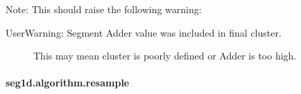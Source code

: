 \documentclass[letterpaper,10pt,english]{sphinxmanual}
\begin{document}
\begin{fulllineitems}
\sphinxAtStartPar
Note: This should raise the following warning:
\begin{description}
\item[{UserWarning: Segment Adder value was included in final cluster.}] \leavevmode
\sphinxAtStartPar
This may mean cluster is poorly defined or Adder is too high.

\end{description}

\begin{sphinxVerbatim}[commandchars=\\\{\}]
\end{sphinxVerbatim}

\end{fulllineitems}



\paragraph{seg1d.algorithm.resample}
\label{\detokenize{generated/seg1d.algorithm.resample:seg1d-algorithm-resample}}\label{\detokenize{generated/seg1d.algorithm.resample::doc}}
\end{document}

